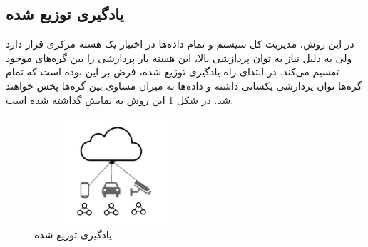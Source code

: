 \subsection{یادگیری توزیع شده}

    در این روش، مدیریت کل سیستم و تمام داده‌ها در اختیار یک هسته مرکزی قرار دارد ولی به دلیل نیاز به توان پردازشی بالا، این هسته بار پردازشی را بین گره‌های موجود تقسیم می‌کند. در ابتدای راه یادگیری توزیع شده، فرض بر این بوده است که تمام گره‌ها توان پردازشی یکسانی داشته و داده‌ها به میزان مساوی بین گره‌ها پخش خواهند شد. در شکل \ref{distributed} این روش به نمایش گذاشته شده است.

    \begin{figure}[H]
      \centering
      \includegraphics[height=4cm,width=6cm]{./types of ML/distributed .jpg}
      \caption[یادگیری توزیع شده]{ یادگیری توزیع شده\cite{ref6}}
      \label{distributed}
      \centering
    \end{figure}


